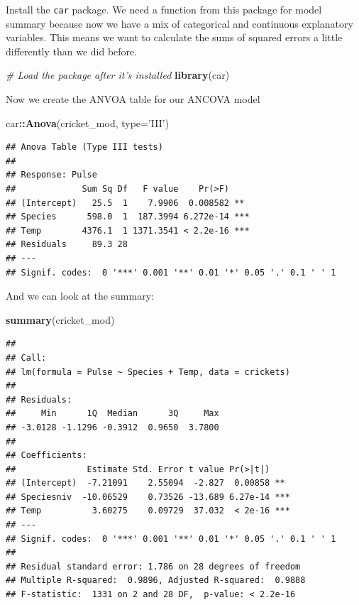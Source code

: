 \documentclass[
]{book}
\newenvironment{Shaded}{\begin{snugshade}}{\end{snugshade}}
\newcommand{\CommentTok}[1]{\textcolor[rgb]{0.56,0.35,0.01}{\textit{#1}}}
\newcommand{\DataTypeTok}[1]{\textcolor[rgb]{0.13,0.29,0.53}{#1}}
\newcommand{\KeywordTok}[1]{\textcolor[rgb]{0.13,0.29,0.53}{\textbf{#1}}}
\newcommand{\NormalTok}[1]{#1}
\newcommand{\OperatorTok}[1]{\textcolor[rgb]{0.81,0.36,0.00}{\textbf{#1}}}
\newcommand{\StringTok}[1]{\textcolor[rgb]{0.31,0.60,0.02}{#1}}
\begin{document}
Install the \texttt{car} package. We need a function from this package for model summary because now we have a mix of categorical and continuous explanatory variables. This means we want to calculate the sums of squared errors a little differently than we did before.

\begin{Shaded}
\begin{Highlighting}[]
\CommentTok{# Load the package after it's installed}
\KeywordTok{library}\NormalTok{(car)}
\end{Highlighting}
\end{Shaded}

Now we create the ANVOA table for our ANCOVA model

\begin{Shaded}
\begin{Highlighting}[]
\NormalTok{car}\OperatorTok{::}\KeywordTok{Anova}\NormalTok{(cricket_mod, }\DataTypeTok{type=}\StringTok{'III'}\NormalTok{)}
\end{Highlighting}
\end{Shaded}

\begin{verbatim}
## Anova Table (Type III tests)
## 
## Response: Pulse
##             Sum Sq Df   F value    Pr(>F)    
## (Intercept)   25.5  1    7.9906  0.008582 ** 
## Species      598.0  1  187.3994 6.272e-14 ***
## Temp        4376.1  1 1371.3541 < 2.2e-16 ***
## Residuals     89.3 28                        
## ---
## Signif. codes:  0 '***' 0.001 '**' 0.01 '*' 0.05 '.' 0.1 ' ' 1
\end{verbatim}

And we can look at the summary:

\begin{Shaded}
\begin{Highlighting}[]
\KeywordTok{summary}\NormalTok{(cricket_mod)}
\end{Highlighting}
\end{Shaded}

\begin{verbatim}
## 
## Call:
## lm(formula = Pulse ~ Species + Temp, data = crickets)
## 
## Residuals:
##     Min      1Q  Median      3Q     Max 
## -3.0128 -1.1296 -0.3912  0.9650  3.7800 
## 
## Coefficients:
##              Estimate Std. Error t value Pr(>|t|)    
## (Intercept)  -7.21091    2.55094  -2.827  0.00858 ** 
## Speciesniv  -10.06529    0.73526 -13.689 6.27e-14 ***
## Temp          3.60275    0.09729  37.032  < 2e-16 ***
## ---
## Signif. codes:  0 '***' 0.001 '**' 0.01 '*' 0.05 '.' 0.1 ' ' 1
## 
## Residual standard error: 1.786 on 28 degrees of freedom
## Multiple R-squared:  0.9896,	Adjusted R-squared:  0.9888 
## F-statistic:  1331 on 2 and 28 DF,  p-value: < 2.2e-16
\end{verbatim}
\end{document}
